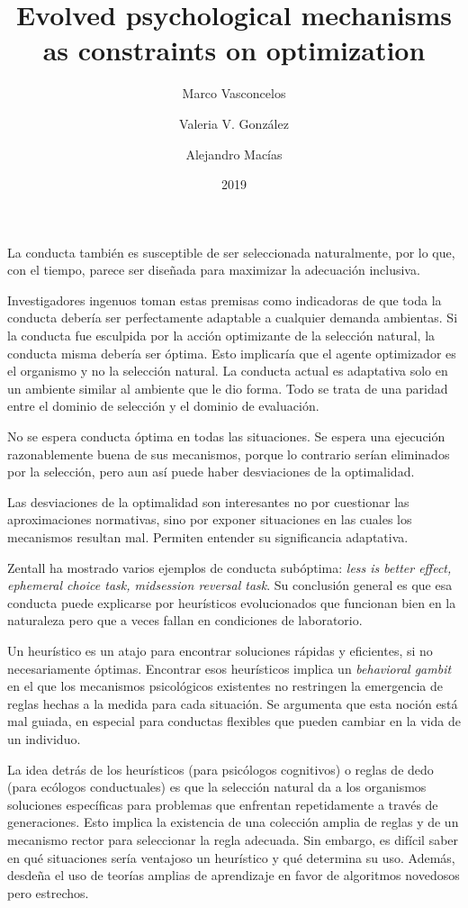 \documentclass[a4paper,12pt]{article}
\title{Evolved psychological mechanisms as constraints on optimization}
\author{Marco Vasconcelos \and Valeria V. González \and Alejandro Macías}
\date{2019}
\begin{document}
{\scshape\bfseries \maketitle}

La conducta también es susceptible de ser seleccionada naturalmente, por lo que, con el tiempo, parece ser diseñada para maximizar la adecuación inclusiva.

Investigadores ingenuos toman estas premisas como indicadoras de que toda la conducta debería ser perfectamente adaptable a cualquier demanda ambientas. Si la conducta fue esculpida por la acción optimizante de la selección natural, la conducta misma debería ser óptima. Esto implicaría que el agente optimizador es el organismo y no la selección natural. La conducta actual es adaptativa solo en un ambiente similar al ambiente que le dio forma. Todo se trata de una paridad entre el dominio de selección y el dominio de evaluación.

No se espera conducta óptima en todas las situaciones. Se espera una ejecución razonablemente buena de sus mecanismos, porque lo contrario serían eliminados por la selección, pero aun así puede haber desviaciones de la optimalidad.

Las desviaciones de la optimalidad son interesantes no por cuestionar las aproximaciones normativas, sino por exponer situaciones en las cuales los mecanismos resultan mal. Permiten entender su significancia adaptativa.

Zentall ha mostrado varios ejemplos de conducta subóptima: {\itshape less is better effect, ephemeral choice task, midsession reversal task}. Su conclusión general es que esa conducta puede explicarse por heurísticos evolucionados que funcionan bien en la naturaleza pero que a veces fallan en condiciones de laboratorio.

Un heurístico es un atajo para encontrar soluciones rápidas y eficientes, si no necesariamente óptimas. Encontrar esos heurísticos implica un {\itshape behavioral gambit} en el que los mecanismos psicológicos existentes no restringen la emergencia de reglas hechas a la medida para cada situación. Se argumenta que esta noción está mal guiada, en especial para conductas flexibles que pueden cambiar en la vida de un individuo.

La idea detrás de los heurísticos (para psicólogos cognitivos) o reglas de dedo (para ecólogos conductuales) es que la selección natural da a los organismos soluciones específicas para problemas que enfrentan repetidamente a través de generaciones. Esto implica la existencia de una colección amplia de reglas y de un mecanismo rector para seleccionar la regla adecuada. Sin embargo, es difícil saber en qué situaciones sería ventajoso un heurístico y qué determina su uso. Además, desdeña el uso de teorías amplias de aprendizaje en favor de algoritmos novedosos pero estrechos.
\end{document}
